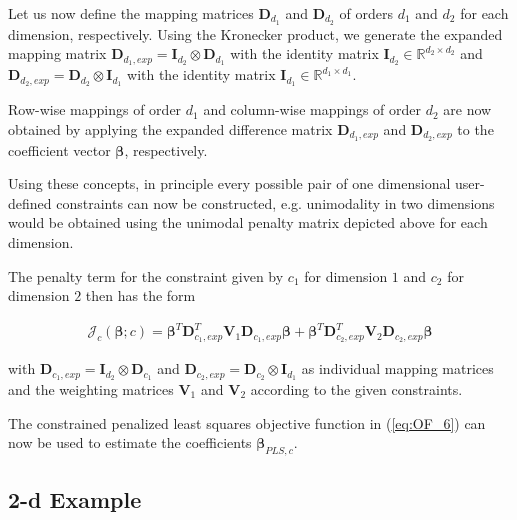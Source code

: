 \documentclass[10pt,a4paper]{article}
\begin{document}
	Let us now define the mapping matrices $\boldsymbol{D}_{d_1}$ and $\boldsymbol{D}_{d_2}$ of orders $d_1$ and $d_2$ for each dimension, respectively. Using the Kronecker product, we generate the expanded mapping matrix $\boldsymbol{D}_{d_{1}, exp} = \boldsymbol{I}_{d_2} \otimes \boldsymbol{D}_{d_1}$ with the identity matrix $\boldsymbol{I}_{d_2} \in \mathbb{R}^{d_2 \times d_2}$ and $\boldsymbol{D}_{d_2,exp} = \boldsymbol{D}_{d_2} \otimes \boldsymbol{I}_{d_1}$ with the identity matrix $\boldsymbol{I}_{d_1} \in \mathbb{R}^{d_1 \times d_1}$. 
	
	Row-wise mappings of order $d_1$ and column-wise mappings of order $d_2$ are now obtained by applying the expanded difference matrix $\boldsymbol{D}_{d_1,exp}$ and $\boldsymbol{D}_{d_2,exp}$ to the coefficient vector $\boldsymbol{\beta}$, respectively. 
	
	Using these concepts, in principle every possible pair of one dimensional user-defined constraints can now be constructed, e.g. unimodality in two dimensions would be obtained using the unimodal penalty matrix depicted above for each dimension. 
	
	The penalty term for the constraint given by $c_1$ for dimension $1$ and $c_2$ for dimension $2$ then has the form
	
	\begin{align} \label{eq:J_c_tps}
		\mathcal J_c(\boldsymbol{\beta}; c) = \boldsymbol{\beta}^T \boldsymbol{D}_{c_1,exp}^T \boldsymbol{V}_1 \boldsymbol{D}_{c_1,exp} \boldsymbol{\beta} + \boldsymbol{\beta}^T \boldsymbol{D}_{c_2,exp}^T \boldsymbol{V}_2 \boldsymbol{D}_{c_2,exp} \boldsymbol{\beta}
	\end{align}
	
	with $\boldsymbol{D}_{c_1,exp} = \boldsymbol{I}_{d_2} \otimes \boldsymbol{D}_{c_1}$ and $\boldsymbol{D}_{c_2,exp} = \boldsymbol{D}_{c_2} \otimes \boldsymbol{I}_{d_1}$ as individual mapping matrices  and the weighting matrices $\boldsymbol{V}_1$ and $\boldsymbol{V}_2$ according to the given constraints.
		
	The constrained penalized least squares objective function in (\ref{eq:OF_6}) can now be used to estimate the coefficients $\boldsymbol{\beta}_{PLS,c}$. \cite{fahrmeir2013regression}
	
	\subsection{2-d Example}
	
\end{document}
